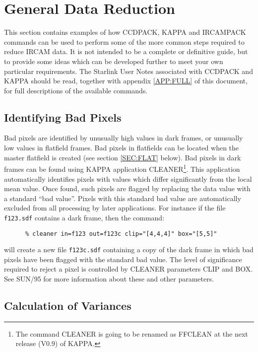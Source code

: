 \section{General Data Reduction}
\label{SEC:GEN}

This section contains examples of how {\small CCDPACK}, {\small KAPPA}
and {\small IRCAMPACK} commands can be used to perform some of the more
common steps required to reduce {\small IRCAM} data. It is not intended
to be a complete or definitive guide, but to provide some ideas which
can be developed further to meet your own particular requirements. The
Starlink User Notes associated with {\small CCDPACK} and {\small KAPPA}
should be read, together with appendix \ref{APP:FULL} of this document,
for full descriptions of the available commands.

\subsection{Identifying Bad Pixels}

Bad pixels are identified by unusually high values in dark frames, or
unusually low values in flatfield frames. Bad pixels in flatfields can
be located when the master flatfield is created (see section
\ref{SEC:FLAT} below). Bad pixels in dark frames can be found using
{\small KAPPA} application {\small CLEANER}\footnote{The command
CLEANER is going to be renamed as FFCLEAN at the next release (V0.9) of
KAPPA.}. This application automatically identifies pixels with values
which differ significantly from the local mean value. Once found, such
pixels are flagged by replacing the data value with a standard ``bad
value''.  Pixels with this standard bad value are automatically
excluded from all processing by later applications. For instance if the
file \verb+f123.sdf+ contains a dark frame, then the command:

\small
\begin{verbatim}
      % cleaner in=f123 out=f123c clip="[4,4,4]" box="[5,5]"
\end{verbatim}
\normalsize

will create a new file \verb+f123c.sdf+ containing a copy of the dark
frame in which bad pixels have been flagged with the standard bad
value. The level of significance required to reject a pixel is
controlled by {\small CLEANER} parameters {\small CLIP} and {\small
BOX}. See SUN/95 for more information about these and other
parameters.

\subsection{Calculation of Variances}

